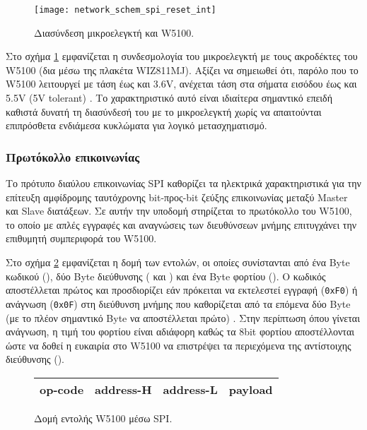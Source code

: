 \begin{figure}
    \caption{Διασύνδεση μικροελεγκτή και W5100.
    \label{fig:network:spi_reset_int}}
    \begin{center}
    \texttt{[image: network\_schem\_spi\_reset\_int]}
    \end{center}
\end{figure}

Στο σχήμα \ref{fig:network:spi_reset_int} εμφανίζεται η συνδεσμολογία του
μικροελεγκτή με τους ακροδέκτες του W5100 (δια μέσω της πλακέτα WIZ811MJ).
Αξίζει να σημειωθεί ότι, παρόλο που το W5100 λειτουργεί με τάση έως και 3.6V,
ανέχεται τάση στα σήματα εισόδου έως και 5.5V (\textenglish{5V tolerant})
\parencite[64]{wiz11:w5100}. Το χαρακτηριστικό αυτό είναι ιδιαίτερα σημαντικό
επειδή καθιστά δυνατή τη διασύνδεσή του με το μικροελεγκτή χωρίς να απαιτούνται
επιπρόσθετα ενδιάμεσα κυκλώματα για λογικό μετασχηματισμό. %


\subsubsection{Πρωτόκολλο επικοινωνίας}

Το πρότυπο διαύλου επικοινωνίας SPI καθορίζει τα ηλεκτρικά χαρακτηριστικά για
την επίτευξη αμφίδρομης ταυτόχρονης bit-προς-bit ζεύξης επικοινωνίας μεταξύ
Master και Slave διατάξεων.
Σε αυτήν την υποδομή στηρίζεται το πρωτόκολλο του W5100, το οποίο με απλές
εγγραφές και αναγνώσεις των διευθύνσεων μνήμης επιτυγχάνει την επιθυμητή
συμπεριφορά του W5100.

Στο σχήμα \ref{fig:network:w5100-command-format} εμφανίζεται η δομή των εντολών,
οι οποίες συνίστανται από ένα Byte κωδικού (), δύο Byte διεύθυνσης
( και ) και ένα Byte φορτίου (). Ο
κωδικός αποστέλλεται πρώτος και προσδιορίζει εάν πρόκειται να εκτελεστεί εγγραφή
(\verb~0xF0~) ή ανάγνωση (\verb~0x0F~) στη διεύθυνση μνήμης που καθορίζεται από
τα επόμενα δύο Byte (με το πλέον σημαντικό Byte να αποστέλλεται πρώτο)
\parencite[61]{wiz11:w5100}.
Στην περίπτωση όπου γίνεται ανάγνωση, η τιμή του φορτίου είναι αδιάφορη καθώς τα
8bit φορτίου αποστέλλονται ώστε να δοθεί η ευκαιρία στο W5100 να επιστρέψει τα
περιεχόμενα της αντίστοιχης διεύθυνσης ().

\begin{figure}
    \caption{Δομή εντολής W5100 μέσω SPI.
    \label{fig:network:w5100-command-format}}
    \begin{center}\begin{tabu} spread 0pt {|*4{X[1,c]|}}

    \hline
    op-code & address-H & address-L & payload \\
    \hline

    \end{tabu}\end{center}
\end{figure}

